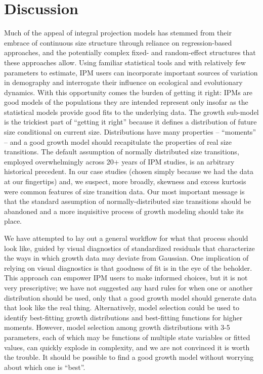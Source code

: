 \documentclass[12pt]{article}
\begin{document}
\section{Discussion}
\label{sec:Discussion} 
Much of the appeal of integral projection models has stemmed from their embrace of continuous size structure through reliance on regression-based approaches, and the potentially complex fixed- and random-effect structures that these approaches allow. 
Using familiar statistical tools and with relatively few parameters to estimate, IPM users can incorporate important sources of variation in demography and interrogate their influence on ecological and evolutionary dynamics. 
With this opportunity comes the burden of getting it right: IPMs are good models of the populations they are intended represent only insofar as the statistical models provide good fits to the underlying data. 
The growth sub-model is the trickiest part of ``getting it right'' because it defines a distribution of future size conditional on current size. 
Distributions have many properties -- ``moments'' -- and a good growth model should recapitulate the properties of real size transitions. 
The default assumption of normally distributed size transitions, employed overwhelmingly across 20+ years of IPM studies, is an arbitrary historical precedent. 
In our case studies (chosen simply because we had the data at our fingertips) and, we suspect, more broadly, skewness and excess kurtosis were common features of size transition data. 
Our most important message is that the standard assumption of normally-distributed size transitions should be abandoned and a more inquisitive process of growth modeling should take its place. 

We have attempted to lay out a general workflow for what that process should look like, guided by visual diagnostics of standardized residuals that characterize the ways in which growth data may deviate from Gaussian. 
One implication of relying on visual diagnostics is that goodness of fit is in the eye of the beholder. 
This approach can empower IPM users to make informed choices, but it is not very prescriptive; we have not suggested any hard rules for when one or another distribution should be used, only that a good growth model should generate data that look like the real thing. 
Alternatively, model selection could be used to identify best-fitting growth distributions and best-fitting functions for higher moments. 
However, model selection among growth distributions with 3-5 parameters, each of which may be functions of multiple state variables or fitted values, can quickly explode in complexity, and we are not convinced it is worth the trouble. 
It should be possible to find a good growth model without worrying about which one is ``best''. 
\end{document}
